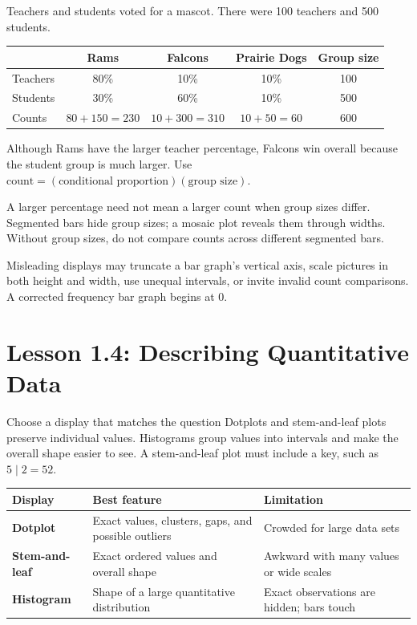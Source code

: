 \documentclass[11pt]{article}
\newcommand{\ans}[1]{\textcolor{AnswerBlue}{#1}}
\begin{document}
Teachers and students voted for a mascot. There were 100 teachers and 500 students.

\begin{center}
\begin{tabular}{l|ccc|c}
 & Rams & Falcons & Prairie Dogs & Group size\\ \hline
Teachers & 80\% & 10\% & 10\% & 100\\
Students & 30\% & 60\% & 10\% & 500\\ \hline
Counts & \ans{$80+150=230$} & \ans{$10+300=310$} & \ans{$10+50=60$} & 600
\end{tabular}
\end{center}

Although Rams have the larger teacher percentage, Falcons win overall because the student group is much larger. Use $\text{count}=(\text{conditional proportion})(\text{group size})$.

\begin{trapbox}
A larger percentage need not mean a larger count when group sizes differ. Segmented bars hide group sizes; a mosaic plot reveals them through widths. Without group sizes, do not compare counts across different segmented bars.
\end{trapbox}

Misleading displays may truncate a bar graph's vertical axis, scale pictures in both height and width, use unequal intervals, or invite invalid count comparisons. A corrected frequency bar graph begins at 0.

\section{Lesson 1.4: Describing Quantitative Data}

\begin{bigidea}{Choose a display that matches the question}
Dotplots and stem-and-leaf plots preserve individual values. Histograms group values into intervals and make the overall shape easier to see. A stem-and-leaf plot must include a key, such as $5\mid2=52$.
\end{bigidea}

\begin{tabularx}{\textwidth}{>{\bfseries\color{Navy}}p{1.35in} Y Y}
\toprule
Display & Best feature & Limitation\\
\midrule
Dotplot & Exact values, clusters, gaps, and possible outliers & Crowded for large data sets\\
Stem-and-leaf & Exact ordered values and overall shape & Awkward with many values or wide scales\\
Histogram & Shape of a large quantitative distribution & Exact observations are hidden; bars touch\\
\bottomrule
\end{tabularx}
\end{document}
